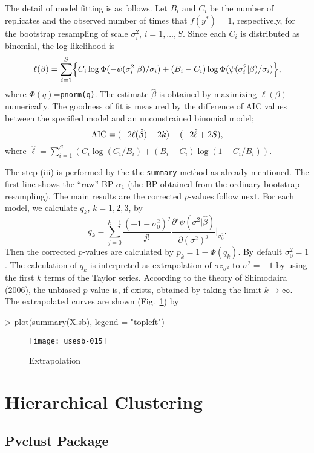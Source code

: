 \documentclass[a4paper]{amsart}
\begin{document}
The detail of model fitting is as follows. Let $B_i$ and $C_i$ be the
number of replicates and the observed number of times that $f(y^*)=1$,
respectively, for the bootstrap resampling of scale $\sigma^2_i$,
$i=1,\ldots,S$. Since each $C_i$ is distributed as binomial, the
log-likelihood is
\[
\ell(\beta) = \sum_{i=1}^S \Bigl\{
C_i \log \Phi(-\psi(\sigma^2_i|\beta)/\sigma_i)+
(B_i - C_i) \log \Phi(\psi(\sigma^2_i|\beta)/\sigma_i)
\Bigr\},
\]
where $\Phi(q)$={\tt pnorm(q)}. The estimate $\hat\beta$ is obtained
by maximizing $\ell(\beta)$ numerically.  The goodness of fit is
measured by the difference of AIC values between the specified model
and an unconstrained binomial model;
\[
{\rm AIC} = ( -2\ell(\hat\beta)+2k ) - (-2\hat\ell + 2S),
\]
where $\hat\ell = \sum_{i=1}^S ( C_i\log(C_i/B_i) +
(B_i-C_i)\log(1-C_i/B_i)) $.


The step (iii) is performed by the the {\tt summary} method as already
mentioned. The first line shows the ``raw'' BP $\alpha_1$ (the BP
obtained from the ordinary bootstrap resampling).  The main results
are the corrected $p$-values follow next. For each model, we calculate
$q_k$, $k=1,2,3$, by
\[
q_k = \sum_{j=0}^{k-1} \frac{(-1-\sigma_0^2)^j}{j!}
\frac{\partial^j \psi(\sigma^2|\hat\beta)}{\partial (\sigma^2)^j}
\Bigr|_{\sigma_0^2}.
\]
Then the corrected $p$-values are calculated by $p_k=1-\Phi(q_k)$.
By default $\sigma_0^2=1$. The
calculation of $q_k$ is interpreted as extrapolation of $\sigma
z_{\sigma^2}$ to $\sigma^2=-1$ by using the first $k$ terms of the
Taylor series. According to the theory of Shimodaira (2006), the
unbiased $p$-value is, if exists, obtained by taking the limit
$k\to\infty$. The extrapolated curves are shown (Fig.~\ref{fig:diag1s}) by
\begin{Schunk}
\begin{Sinput}
> plot(summary(X.sb), legend = "topleft")
\end{Sinput}
\end{Schunk}
\begin{figure}
\begin{center}
\texttt{[image: usesb-015]}
\caption{Extrapolation}\label{fig:diag1s}
\end{center}
\end{figure}


\section{Hierarchical Clustering}

\subsection{Pvclust Package}
\end{document}
